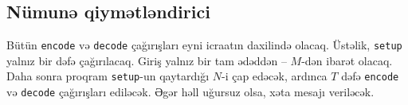 \documentclass[12pt]{article}
\begin{document}
\subsection{Nümunə qiymətləndirici}

Bütün \texttt{encode} və \texttt{decode} çağırışları eyni icraatın daxilində olacaq. Üstəlik, \texttt{setup} yalnız bir dəfə çağırılacaq. Giriş yalnız bir tam ədəddən – $M$-dən ibarət olacaq. Daha sonra proqram \texttt{setup}-un qaytardığı $N$-i çap edəcək, ardınca $T$ dəfə \texttt{encode} və \texttt{decode} çağırışları ediləcək. Əgər həll uğursuz olsa, xəta mesajı veriləcək.
\end{document}
